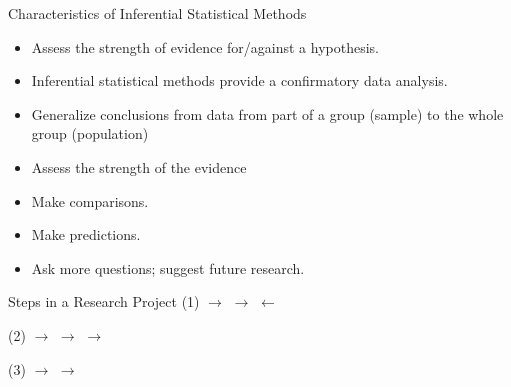 \begin{frame}[t]{Characteristics of Inferential Statistical Methods}
	\begin{itemize}
		\item Assess the strength of evidence for/against a hypothesis.
		\item Inferential statistical methods provide a confirmatory
		data analysis.
		\item Generalize conclusions from data from part of a
		group (sample) to the whole group (population)
		\item Assess the strength of the evidence
		\item Make comparisons.
		\item Make predictions.
		\item Ask more questions; suggest future research.
	\end{itemize}
\end{frame}



\begin{frame}[t]{Steps in a Research Project}
(1)  $\rightarrow$  $\rightarrow$  $\leftarrow$ 

\vspace{20pt}

(2)  $\rightarrow$  $\rightarrow$ 
 $\rightarrow$  

\vspace{20pt}

(3)  $\rightarrow$  $\rightarrow$ 
	
\end{frame}

